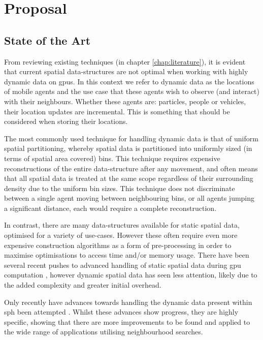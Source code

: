 \chapter{Proposal\label{chap:proposal}}

  \section{State of the Art}
    From reviewing existing techniques (in chapter \ref{chap:literature}), it is evident that current spatial data-structures are not optimal when working with highly dynamic data on \glspl{gpu}. In this context we refer to dynamic data as the locations of mobile agents and the use case that these agents wish to observe (and interact) with their neighbours. Whether these agents are: particles, people or vehicles, their location updates are incremental. This is something that should be considered when storing their locations.
    
    The most commonly used technique for handling dynamic data is that of uniform spatial partitioning, whereby spatial data is partitioned into uniformly sized (in terms of spatial area covered) bins. This technique requires expensive reconstructions of the entire data-structure after any movement, and often means that all spatial data is treated at the same scope regardless of their surrounding density due to the uniform bin sizes. This technique does not discriminate between a single agent moving between neighbouring bins, or all agents jumping a significant distance, each would require a complete reconstruction.
    
    In contrast, there are many data-structures available for static spatial data, optimised for a variety of use-cases. However these often require even more expensive construction algorithms as a form of pre-processing in order to maximise optimisations to access time and/or memory usage. There have been several recent pushes to advanced handling of static spatial data during \gls{gpu} computation \cite{LS*06,LB*16}, however dynamic spatial data has seen less attention, likely due to the added complexity and greater initial overhead.
    
    Only recently have advances towards handling the dynamic data present within \gls{sph} been attempted \cite{HY*15,JR*15}. Whilst these advances show progress, they are highly specific, showing that there are more improvements to be found and applied to the wide range of applications utilising neighbourhood searches.
    
